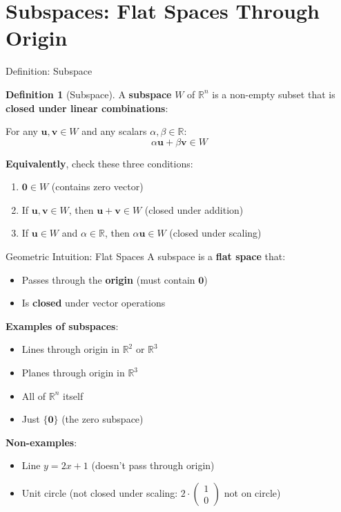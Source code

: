 \documentclass[10pt]{beamer}
\theoremstyle{definition}
\newtheorem{defi}{Definition}[section]
\newcommand{\x}[1]{\alert{\textbf{#1}}}
\begin{document}
\section{Subspaces: Flat Spaces Through Origin}

\begin{frame}{Definition: Subspace}
\begin{defi}[Subspace]
A \x{subspace} $W$ of $\mathbb{R}^n$ is a non-empty subset that is \x{closed under linear combinations}:

For any $\mathbf{u}, \mathbf{v} \in W$ and any scalars $\alpha, \beta \in \mathbb{R}$:
$$\alpha \mathbf{u} + \beta \mathbf{v} \in W$$
\end{defi}

\vfill
\x{Equivalently}, check these three conditions:
\begin{enumerate}
\item $\mathbf{0} \in W$ (contains zero vector)
\item If $\mathbf{u}, \mathbf{v} \in W$, then $\mathbf{u} + \mathbf{v} \in W$ (closed under addition)
\item If $\mathbf{u} \in W$ and $\alpha \in \mathbb{R}$, then $\alpha \mathbf{u} \in W$ (closed under scaling)
\end{enumerate}
\end{frame}

\begin{frame}{Geometric Intuition: Flat Spaces}
A subspace is a \x{flat space} that:
\begin{itemize}
\item Passes through the \x{origin} (must contain $\mathbf{0}$)
\item Is \x{closed} under vector operations
\end{itemize}

\vfill
\x{Examples of subspaces}:
\begin{itemize}
\item Lines through origin in $\mathbb{R}^2$ or $\mathbb{R}^3$
\item Planes through origin in $\mathbb{R}^3$
\item All of $\mathbb{R}^n$ itself
\item Just $\{\mathbf{0}\}$ (the zero subspace)
\end{itemize}

\vfill
\x{Non-examples}:
\begin{itemize}
\item Line $y = 2x + 1$ (doesn't pass through origin)
\item Unit circle (not closed under scaling: $2 \cdot \begin{pmatrix} 1 \\ 0 \end{pmatrix}$ not on circle)
\end{itemize}
\end{frame}
\end{document}
